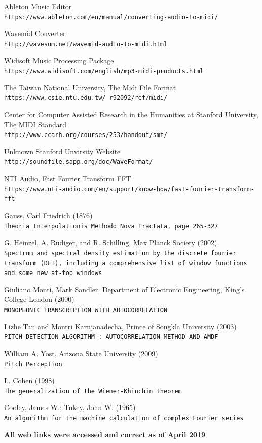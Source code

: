 \documentclass[12pt]{report}
\begin{document}
\newpage
{}
\begin{thebibliography}{9}


Ableton Music Editor
\\\texttt{https://www.ableton.com/en/manual/converting-audio-to-midi/}

Wavemid Converter
\\\texttt{http://wavesum.net/wavemid-audio-to-midi.html}

Widisoft Music Processing Package
\\\texttt{https://www.widisoft.com/english/mp3-midi-products.html}

The Taiwan National University, The Midi File Format
\\\texttt{https://www.csie.ntu.edu.tw/~r92092/ref/midi/}

Center for Computer Assisted Research in the Humanities 
at Stanford University, The MIDI Standard
\\\texttt{http://www.ccarh.org/courses/253/handout/smf/}

Unknown Stanford Unvirsity Website
\\\texttt{http://soundfile.sapp.org/doc/WaveFormat/}

NTI Audio, Fast Fourier Transform FFT
\\\texttt{https://www.nti-audio.com/en/support/know-how/fast-fourier-transform-fft}

Gauss, Carl Friedrich (1876)
\\\texttt{Theoria Interpolationis Methodo Nova Tractata, page 265-327}

G. Heinzel, A. Rudiger, and R. Schilling, Max Planck Society (2002)
\\\texttt{Spectrum and spectral density estimation by the discrete fourier
transform (DFT), including a comprehensive list of window functions and some new at-top windows}

Giuliano Monti, Mark Sandler, Department of Electronic Engineering, King's College London (2000)
\\\texttt{MONOPHONIC TRANSCRIPTION WITH AUTOCORRELATION}

Lizhe Tan and Montri Karnjanadecha, Prince of Songkla University (2003)
\\\texttt{PITCH DETECTION ALGORITHM : AUTOCORRELATION METHOD AND AMDF}

William A. Yost, Arizona State University (2009)
\\\texttt{Pitch Perception}

L. Cohen (1998)
\\\texttt{The generalization of the Wiener-Khinchin theorem}

Cooley, James W.; Tukey, John W. (1965)
\\\texttt{An algorithm for the machine calculation of complex Fourier series}

\end{thebibliography}
\textbf{All web links were accessed and correct as of April 2019}
\end{document}

